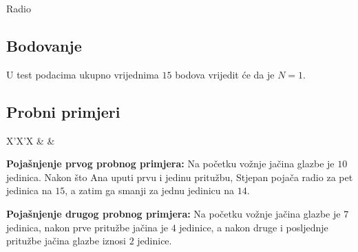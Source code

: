 \begin{statement}[
  problempoints=30,
  timelimit=1 sekunda,
  memorylimit=512 MiB,
]{Radio}
\subsection*{Bodovanje}
U test podacima ukupno vrijednima $15$ bodova vrijedit će da je $N = 1$.

\subsection*{Probni primjeri}
\begin{tabularx}{\textwidth}{X'X'X}
 &
 &
\end{tabularx}

\textbf{Pojašnjenje prvog probnog primjera:}
Na početku vožnje jačina glazbe je $10$ jedinica. Nakon što Ana uputi prvu i
jedinu pritužbu, Stjepan pojača radio za pet jedinica na $15$, a zatim ga
smanji za jednu jedinicu na $14$.

\textbf{Pojašnjenje drugog probnog primjera:}
Na početku vožnje jačina glazbe je $7$ jedinica, nakon prve pritužbe jačina je
$4$ jedinice, a nakon druge i posljednje pritužbe jačina glazbe iznosi $2$
jedinice.

\end{statement}

